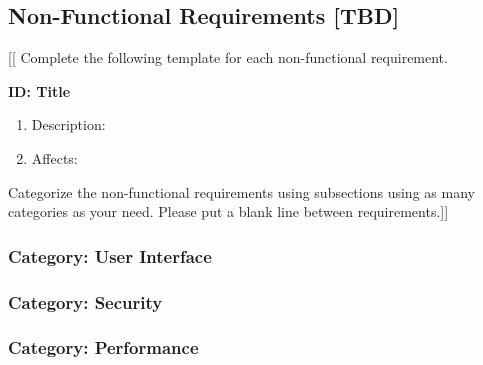 \subsection{Non-Functional Requirements \textbf{[TBD]}}

[[ Complete the following template for each non-functional requirement. 


\textbf{ID: Title}
\begin{enumerate}
    \item Description:
    \item Affects: 
\end{enumerate}

Categorize the non-functional requirements using subsections using as many
categories as your need.
Please put a blank line between requirements.]]


\subsubsection{Category: User Interface}

\subsubsection{Category: Security}

\subsubsection{Category: Performance}


